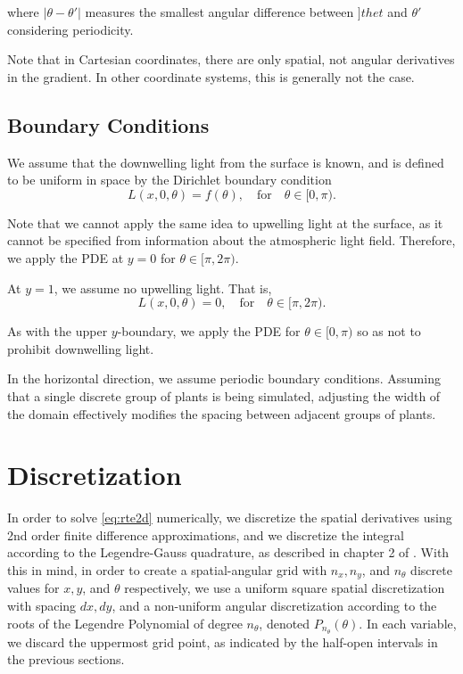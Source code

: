 \documentclass[10pt]{article}
\newcommand\abs[1]{\left| #1 \right|}
\begin{document}
\begin{multicols}{2}
where $\abs{\theta-\theta'}$ measures the smallest angular difference between $]thet$ and $\theta'$ considering periodicity.

Note that in Cartesian coordinates, there are only spatial, not angular derivatives in the gradient.
In other coordinate systems, this is generally not the case.
	
\subsection{Boundary Conditions}
We assume that the downwelling light from the surface is known, and is defined to be uniform in space by the Dirichlet boundary condition 
\begin{equation}
	L(x,0,\theta) = f(\theta), \quad \mbox{for} \quad \theta \in [0,\pi).
	\label{eq:surf_bc}
\end{equation}

Note that we cannot apply the same idea to upwelling light at the surface, as it cannot be specified from information about the atmospheric light field.
Therefore, we apply the PDE at $y=0$ for $\theta \in [\pi,2\pi)$.

At $y=1$, we assume no upwelling light.
That is,
\begin{equation}
	L(x,0,\theta) = 0, \quad \mbox{for} \quad \theta \in [\pi,2\pi).
	\label{eq:bottom_bc}
\end{equation}

As with the upper $y$-boundary, we apply the PDE for $\theta \in [0,\pi)$ so as not to prohibit downwelling light.

In the horizontal direction, we assume periodic boundary conditions.
Assuming that a single discrete group of plants is being simulated, adjusting the width of the domain effectively modifies the spacing between adjacent groups of plants.

\section{Discretization}
In order to solve \eqref{eq:rte2d} numerically, we discretize the spatial derivatives using 2nd order finite difference approximations, and we discretize the integral according to the Legendre-Gauss quadrature, as described in chapter 2 of \citet{chandrasekhar_radiative_1960}.
With this in mind, in order to create a spatial-angular grid with $n_x,n_y$, and $n_\theta$ discrete values for $x, y$, and $\theta$ respectively, we use a uniform square spatial discretization with spacing $dx, dy$, and a non-uniform angular discretization according to the roots of the Legendre Polynomial of degree $n_\theta$, denoted $P_{n_\theta}(\theta)$.
In each variable, we discard the uppermost grid point, as indicated by the half-open intervals in the previous sections.


\end{multicols}
\end{document}
